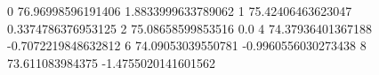 0 76.96998596191406 1.8833999633789062
1 75.42406463623047 0.3374786376953125
2 75.08658599853516 0.0
4 74.37936401367188 -0.7072219848632812
6 74.09053039550781 -0.9960556030273438
8 73.611083984375 -1.4755020141601562
